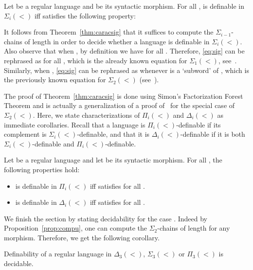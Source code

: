 \documentclass[envcountsame]{llncs}
\newcommand{\dew}[1]{\ensuremath{\Delta_{#1}(<)}\xspace}
\newcommand{\sic}[1]{\ensuremath{\Sigma_{#1}}\xspace}
\newcommand{\siw}[1]{\ensuremath{\Sigma_{#1}(<)}\xspace}
\newcommand{\piw}[1]{\ensuremath{\Pi_{#1}(<)}\xspace}
\newcommand{\siwu}{\ensuremath{\Sigma_{1}(<)}\xspace}
\newcommand{\siwd}{\ensuremath{\Sigma_{2}(<)}\xspace}
\newcommand{\dewt}{\ensuremath{\Delta_{3}(<)}\xspace}
\newcommand{\siwt}{\ensuremath{\Sigma_{3}(<)}\xspace}
\newcommand{\piwt}{\ensuremath{\Pi_{3}(<)}\xspace}
\newcommand\qchains[1]{\ensuremath{\sic{#1}}-chains\xspace}
\newcommand\dchains{\qchains{2}}
\begin{document}
\begin{theorem} \label{thm:caracsig}
  Let  be a regular language and  be its
  syntactic morphism. For all ,  is definable in \siw{i}
  iff  satisfies the following property: 
  
\end{theorem}

It follows from Theorem~\ref{thm:caracsig} that it suffices to compute
the \qchains{i-1} of length  in order to decide whether a
language is definable in \siw{i}. Also observe that when ,
by definition we have  for all . Therefore, \eqref{eq:sig} can be rephrased as  for all
, which is the already known equation for \siwu, see~\cite{pwdelta}. Similarly, when , \eqref{eq:sig} can be
rephrased as  whenever  is a
`subword' of , which is the previously known equation for \siwd
(see~\cite{pwdelta,bfacto}).

The proof of Theorem~\ref{thm:caracsig} is done using Simon's
Factorization Forest Theorem and is actually a generalization of a
proof of~\cite{bfacto} for the special case of \siwd. Here, we state characterizations of \piw{i}
and \dew{i} as immediate corollaries. Recall that a language is
\piw{i}-definable if its complement is \siw{i}-definable, and that
it is \dew{i}-definable if it is both \siw{i}-definable and
\piw{i}-definable. 

\begin{corollary} \label{cor:caracpi}
  Let  be a regular language and let  be its
  syntactic morphism. For all , the following properties hold:
  \begin{itemize}
  \item  is definable in \piw{i} iff  satisfies  for all .
  \item  is definable in \dew{i} iff  satisfies  for all .
  \end{itemize}
\end{corollary}

We finish the section by stating decidability for the case .
Indeed by Proposition~\ref{prop:compu}, one can compute the \dchains
of length  for any morphism. Therefore, we get the following
corollary.

\begin{corollary} \label{cor:decid}  
  Definability of a regular language in \dewt, \siwt or \piwt is decidable.
\end{corollary}
\end{document}
